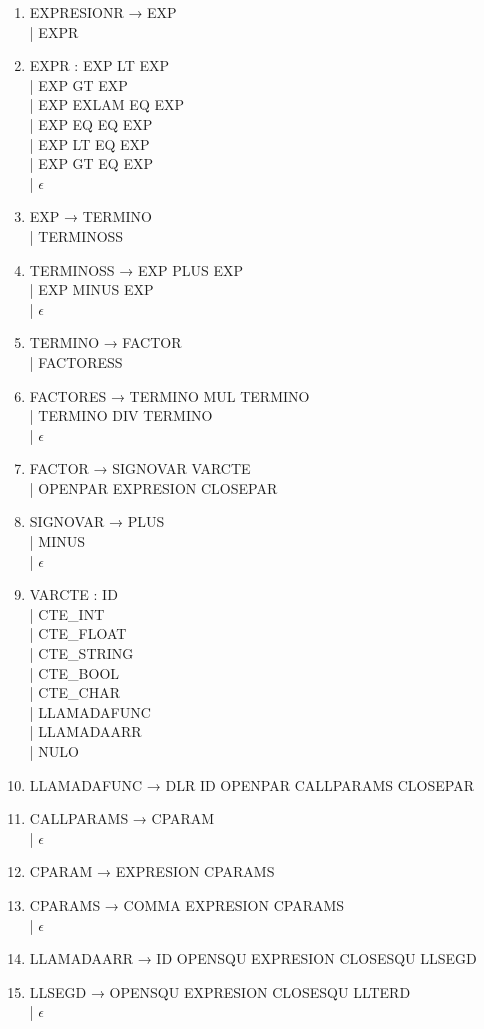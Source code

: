{\begin{enumerate}
    \item EXPRESIONR → EXP \\ | EXPR
    \item EXPR : EXP LT EXP \\ | EXP GT EXP \\ | EXP EXLAM EQ EXP \\ | EXP EQ EQ EXP \\ | EXP LT EQ EXP \\ | EXP GT EQ EXP \\ | $\epsilon$
    \item EXP → TERMINO \\ | TERMINOSS
    \item TERMINOSS → EXP PLUS EXP \\ | EXP MINUS EXP \\ | $\epsilon$
    \item TERMINO → FACTOR \\ | FACTORESS
    \item FACTORES → TERMINO MUL TERMINO \\ | TERMINO DIV TERMINO \\ | $\epsilon$
    \item FACTOR → SIGNOVAR VARCTE \\ | OPENPAR EXPRESION CLOSEPAR
    \item SIGNOVAR → PLUS \\ | MINUS \\ | $\epsilon$
    \item VARCTE : ID \\ | CTE\_INT \\ | CTE\_FLOAT \\ | CTE\_STRING \\ | CTE\_BOOL \\ | CTE\_CHAR \\ | LLAMADAFUNC \\ | LLAMADAARR \\ | NULO
    \item LLAMADAFUNC →  DLR ID OPENPAR CALLPARAMS CLOSEPAR
    \item CALLPARAMS → CPARAM \\ | $\epsilon$
    \item CPARAM → EXPRESION CPARAMS
    \item CPARAMS → COMMA EXPRESION CPARAMS \\ | $\epsilon$
    \item LLAMADAARR → ID OPENSQU EXPRESION CLOSESQU LLSEGD
    \item LLSEGD → OPENSQU EXPRESION CLOSESQU LLTERD \\ | $\epsilon$

\end{enumerate}}
